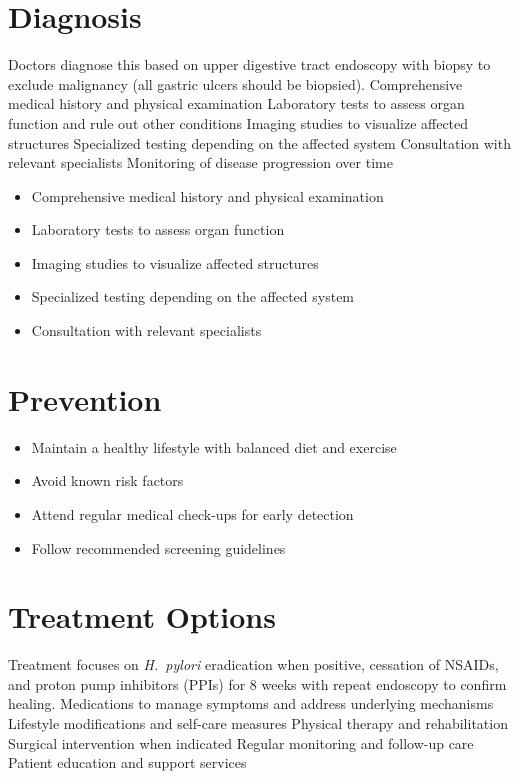 \section{Diagnosis}
Doctors diagnose this based on upper digestive tract endoscopy with biopsy to exclude malignancy (all gastric ulcers should be biopsied). Comprehensive medical history and physical examination Laboratory tests to assess organ function and rule out other conditions Imaging studies to visualize affected structures Specialized testing depending on the affected system Consultation with relevant specialists Monitoring of disease progression over time

\begin{itemize}[noitemsep]
  \item Comprehensive medical history and physical examination
  \item Laboratory tests to assess organ function
  \item Imaging studies to visualize affected structures
  \item Specialized testing depending on the affected system
  \item Consultation with relevant specialists
\end{itemize}
\section{Prevention}
\begin{itemize}[noitemsep]
  \item Maintain a healthy lifestyle with balanced diet and exercise
  \item Avoid known risk factors
  \item Attend regular medical check-ups for early detection
  \item Follow recommended screening guidelines
\end{itemize}
\section{Treatment Options}
Treatment focuses on \textit{H.~pylori} eradication when positive, cessation of NSAIDs, and proton pump inhibitors (PPIs) for 8 weeks with repeat endoscopy to confirm healing. Medications to manage symptoms and address underlying mechanisms Lifestyle modifications and self-care measures Physical therapy and rehabilitation Surgical intervention when indicated Regular monitoring and follow-up care Patient education and support services

